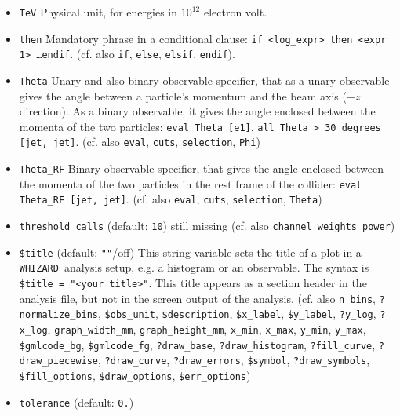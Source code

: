 \documentclass[12pt]{book}
\newcommand{\ttt}[1]{\texttt{#1}}
\newcommand{\whizard}{\texttt{WHIZARD}}
\begin{document}
\begin{itemize}
\item
\ttt{TeV} \newline
Physical unit, for energies in $10^{12}$ electron volt.
\item
\ttt{then} \newline
Mandatory phrase in a conditional clause: \ttt{if <log\_expr> then
  <expr 1> \ldots endif}. (cf. also \ttt{if}, \ttt{else}, \ttt{elsif},
\ttt{endif}).
\item
\ttt{Theta} \newline
Unary and also binary observable specifier, that as a unary observable
gives the angle between a particle's momentum and the beam axis ($+z$
direction). As a binary observable, it gives the angle enclosed
between the momenta of the two particles: \ttt{eval Theta [e1]},
\ttt{all Theta > 30 degrees [jet, jet]}. (cf. also \ttt{eval},
\ttt{cuts}, \ttt{selection}, \ttt{Phi}) 
\item
\ttt{Theta\_RF} \newline
Binary observable specifier, that gives the angle enclosed
between the momenta of the two particles in the rest frame of the
collider: \ttt{eval Theta\_RF [jet, jet]}. (cf. also \ttt{eval},
\ttt{cuts}, \ttt{selection}, \ttt{Theta}) 
\item
{\color{red} \ttt{threshold\_calls} \qquad (default: \ttt{10})
  \newline 
still missing (cf. also \ttt{channel\_weights\_power})}
\item
\ttt{\$title} \qquad (default: \ttt{""}/off) \newline
This string variable sets the title of a plot in a \whizard\ analysis
setup, e.g. a histogram or an observable. The syntax is \ttt{\$title =
  "<your title>"}. This title appears as a section header in the
analysis file, but not in the screen output of the analysis.
 (cf. also 
\ttt{n\_bins}, \ttt{?normalize\_bins}, \ttt{\$obs\_unit},
\ttt{\$description}, \ttt{\$x\_label},
\ttt{\$y\_label}, \ttt{?y\_log}, \ttt{?x\_log},
\ttt{graph\_width\_mm}, \ttt{graph\_height\_mm}, 
\ttt{x\_min}, \ttt{x\_max}, \ttt{y\_min}, \ttt{y\_max},
\ttt{\$gmlcode\_bg}, \ttt{\$gmlcode\_fg}, \ttt{?draw\_base},
\ttt{?draw\_histogram}, \ttt{?fill\_curve}, \ttt{?draw\_piecewise}, 
\newline \ttt{?draw\_curve}, \ttt{?draw\_errors}, \ttt{\$symbol}, 
\ttt{?draw\_symbols}, \ttt{\$fill\_options}, \ttt{\$draw\_options},
\ttt{\$err\_options})
\item
\ttt{tolerance} \qquad (default: \ttt{0.}) \newline

\end{itemize}
\end{document}

